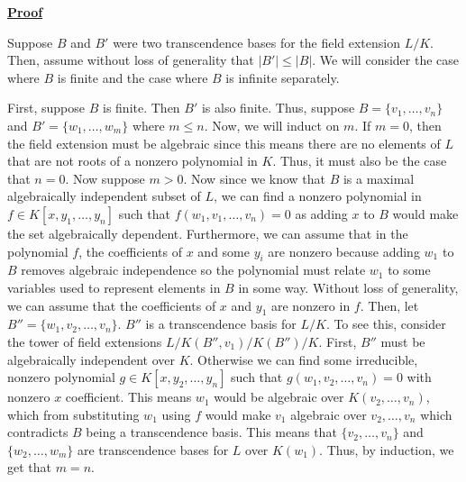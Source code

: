 \documentclass[a4paper, 11pt]{book}
\newcommand{\proof}{\underline{\textbf{Proof}} }
\begin{document}
\proof{Suppose $B$ and $B'$ were two transcendence bases for the field extension $L/K$. Then, assume without loss of generality that $\vert B' \vert \leq \vert B \vert$. We will consider the case where $B$ is finite and the case where $B$ is infinite separately.\par

    First, suppose $B$ is finite. Then $B'$ is also finite. Thus, suppose $B = \{v_1, \ldots, v_n\}$ and $B' = \{w_1, \ldots, w_m\}$ where $m \leq n$. Now, we will induct on $m$. If $m = 0$, then the field extension must be algebraic since this means there are no elements of $L$ that are not roots of a nonzero polynomial in $K$. Thus, it must also be the case that $n = 0$. Now suppose $m > 0$. Now since we know that $B$ is a maximal algebraically independent subset of $L$, we can find a nonzero polynomial in $f \in K[x, y_1, \ldots, y_n]$ such that $f(w_1, v_1, \ldots, v_n) = 0$ as adding $x$ to $B$ would make the set algebraically dependent. Furthermore, we can assume that in the polynomial $f$, the coefficients of $x$ and some $y_i$ are nonzero because adding $w_1$ to $B$ removes algebraic independence so the polynomial must relate $w_1$ to some variables used to represent elements in $B$ in some way. Without loss of generality, we can assume that the coefficients of $x$ and $y_1$ are nonzero in $f$. Then, let $B'' = \{w_1, v_2, \ldots, v_n\}$. $B''$ is a transcendence basis for $L/K$. To see this, consider the tower of field extensions $L/K(B'', v_1)/K(B'')/K$. First, $B''$ must be algebraically independent over $K$. Otherwise we can find some irreducible, nonzero polynomial $g \in K[x, y_2, \ldots, y_n]$ such that $g(w_1, v_2, \ldots, v_n) = 0$ with nonzero $x$ coefficient. This means $w_1$ would be algebraic over $K(v_2, \ldots, v_n)$, which from substituting $w_1$ using $f$ would make $v_1$ algebraic over $v_2, \ldots, v_n$ which contradicts $B$ being a transcendence basis. This means that $\{v_2, \ldots, v_n\}$ and $\{w_2, \ldots, w_m\}$ are transcendence bases for $L$ over $K(w_1)$. Thus, by induction, we get that $m = n$.\par

}
\end{document}
